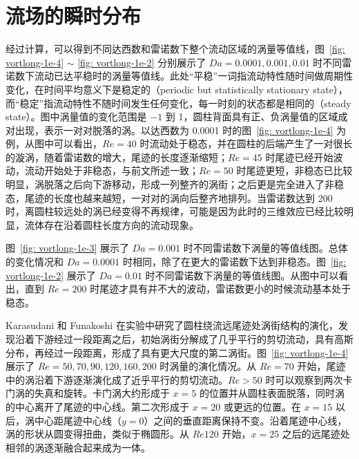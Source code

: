 \section{流场的瞬时分布}\label{sec: transient}

经过计算，可以得到不同达西数和雷诺数下整个流动区域的涡量等值线，图~\ref{fig: vortlong-1e-4} $\sim$ \ref{fig: vortlong-1e-2} 分别展示了 $Da=0.0001,0.001,0.01$ 时不同雷诺数下流动已达平稳时的涡量等值线。此处“平稳”一词指流动特性随时间做周期性变化，在时间平均意义下是稳定的（periodic but statistically stationary state），而“稳定”指流动特性不随时间发生任何变化，每一时刻的状态都是相同的（steady state）。图中涡量值的变化范围是 $-1$ 到 1，圆柱背面具有正、负涡量值的区域成对出现，表示一对对脱落的涡。以达西数为 0.0001 时的图~\ref{fig: vortlong-1e-4} 为例，从图中可以看出，$Re=40$ 时流动处于稳态，并在圆柱的后端产生了一对很长的漩涡，随着雷诺数的增大，尾迹的长度逐渐缩短；$Re=45$ 时尾迹已经开始波动，流动开始处于非稳态，与前文所述一致；$Re=50$ 时尾迹更短，非稳态已比较明显，涡脱落之后向下游移动，形成一列整齐的涡街；之后更是完全进入了非稳态，尾迹的长度也越来越短，一对对的涡向后整齐地排列。当雷诺数达到 200 时，离圆柱较远处的涡已经变得不再规律，可能是因为此时的三维效应已经比较明显，流体存在沿着圆柱长度方向的流动现象。

图~\ref{fig: vortlong-1e-3} 展示了 $Da=0.001$ 时不同雷诺数下涡量的等值线图。总体的变化情况和 $Da=0.0001$ 时相同，除了在更大的雷诺数下达到非稳态。图~\ref{fig: vortlong-1e-2} 展示了 $Da=0.01$ 时不同雷诺数下涡量的等值线图。从图中可以看出，直到 $Re=200$ 时尾迹才具有并不大的波动，雷诺数更小的时候流动基本处于稳态。

Karasudani 和 Funakoshi\cite{Karasudani1994} 在实验中研究了圆柱绕流远尾迹处涡街结构的演化，发现沿着下游经过一段距离之后，初始涡街分解成了几乎平行的剪切流动，具有高斯分布，再经过一段距离，形成了具有更大尺度的第二涡街。图~\ref{fig: vortlong-1e-4} 展示了 $Re=50,70,90,120,160,200$ 时涡量的演化情况。从 $Re=70$ 开始，尾迹中的涡沿着下游逐渐演化成了近乎平行的剪切流动。$Re>50$ 时可以观察到两次卡门涡的失真和旋转。卡门涡大约形成于 $x=5$ 的位置并从圆柱表面脱落，同时涡的中心离开了尾迹的中心线。第二次形成于 $x=20$ 或更远的位置。在 $x=15$ 以后，涡中心距尾迹中心线（$y=0$）之间的垂直距离保持不变。沿着尾迹中心线，涡的形状从圆变得扭曲，类似于椭圆形。从 $Re120$ 开始，$x=25$ 之后的远尾迹处相邻的涡逐渐融合起来成为一体。

